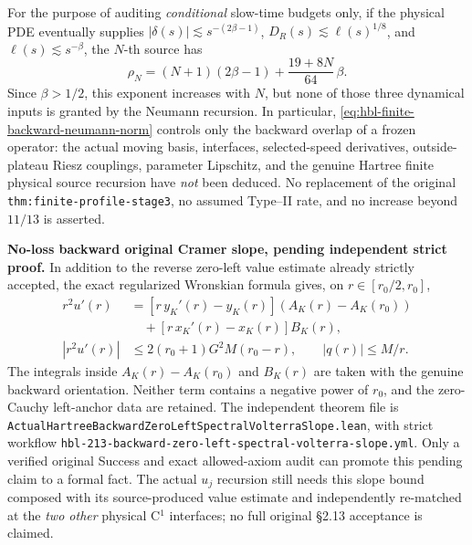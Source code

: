 \documentclass[11pt]{amsart}
\begin{document}
For the purpose of auditing \emph{conditional} slow-time budgets only,
if the physical PDE eventually supplies
$|\delta(s)|\lesssim s^{-(2\beta-1)}$,
$D_R(s)\lesssim\ell(s)^{1/8}$, and
$\ell(s)\lesssim s^{-\beta}$, the $N$-th source has
\[
 \rho_N=(N+1)(2\beta-1)
             +\frac{19+8N}{64}\,\beta.
\]
Since $\beta>1/2$, this exponent increases with $N$,
but none of those three dynamical inputs is granted by the
Neumann recursion. In particular,
\eqref{eq:hbl-finite-backward-neumann-norm} controls only
the backward overlap of a frozen operator:
the actual moving basis, interfaces, selected-speed derivatives,
outside-plateau Riesz couplings, parameter Lipschitz, and
the genuine Hartree finite physical source recursion have
\emph{not} been deduced. No replacement of the original
\texttt{thm:finite-profile-stage3}, no assumed Type--II rate,
and no increase beyond $11/13$ is asserted.


\medskip
\noindent\textbf{No-loss backward original Cramer slope, pending independent strict proof.}
In addition to the reverse zero-left value estimate already strictly
accepted, the exact regularized Wronskian formula gives, on
$r\in[r_0/2,r_0]$,
\[
 \begin{split}
 r^2u'(r)
   &=[r\,y_K'(r)-y_K(r)]\!
       \left(A_K(r)-A_K(r_0)\right)\\
   &\quad +[r\,x_K'(r)-x_K(r)]B_K(r),\\
 |r^2u'(r)|&\le
   2(r_0+1)G^2M(r_0-r),
 \qquad |q(r)|\le M/r.
 \end{split}
\]
The integrals inside $A_K(r)-A_K(r_0)$ and $B_K(r)$ are
taken with the genuine backward orientation. Neither term
contains a negative power of $r_0$, and the zero-Cauchy
left-anchor data are retained. The independent theorem file is
\texttt{ActualHartreeBackwardZeroLeftSpectralVolterraSlope.lean},
with strict workflow
\texttt{hbl-213-backward-zero-left-spectral-volterra-slope.yml}.
Only a verified original Success and exact allowed-axiom audit
can promote this pending claim to a formal fact.
The actual $u_j$ recursion still needs this slope bound composed
with its source-produced value estimate and independently
re-matched at the \emph{two other} physical C$^1$ interfaces;
no full original §2.13 acceptance is claimed.
\end{document}

